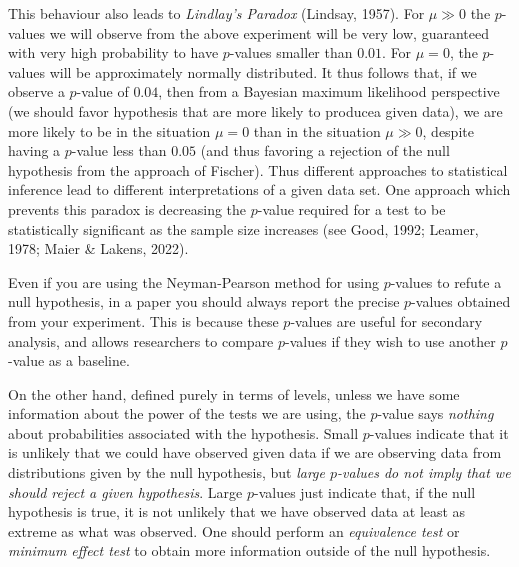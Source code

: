 This behaviour also leads to \emph{Lindlay's Paradox} (Lindsay, 1957). For $\mu \gg 0$ the $p$-values we will observe from the above experiment will be very low, guaranteed with very high probability to have $p$-values smaller than $0.01$. For $\mu = 0$, the $p$-values will be approximately normally distributed. It thus follows that, if we observe a $p$-value of $0.04$, then from a Bayesian maximum likelihood perspective (we should favor hypothesis that are more likely to producea given data), we are more likely to be in the situation $\mu = 0$ than in the situation $\mu \gg 0$, despite having a $p$-value less than $0.05$ (and thus favoring a rejection of the null hypothesis from the approach of Fischer). Thus different approaches to statistical inference lead to different interpretations of a given data set. One approach which prevents this paradox is decreasing the $p$-value required for a test to be statistically significant as the sample size increases (see Good, 1992; Leamer, 1978; Maier \& Lakens, 2022).


Even if you are using the Neyman-Pearson method for using $p$-values to refute a null hypothesis, in a paper you should always report the precise $p$-values obtained from your experiment. This is because these $p$-values are useful for secondary analysis, and allows researchers to compare $p$-values if they wish to use another $p$-value as a baseline.

On the other hand, defined purely in terms of levels, unless we have some information about the power of the tests we are using, the $p$-value says \emph{nothing} about probabilities associated with the hypothesis. Small $p$-values indicate that it is unlikely that we could have observed given data if we are observing data from distributions given by the null hypothesis, but \emph{large $p$-values do not imply that we should reject a given hypothesis}. Large $p$-values just indicate that, if the null hypothesis is true, it is not unlikely that we have observed data at least as extreme as what was observed. One should perform an \emph{equivalence test} or \emph{minimum effect test} to obtain more information outside of the null hypothesis.



